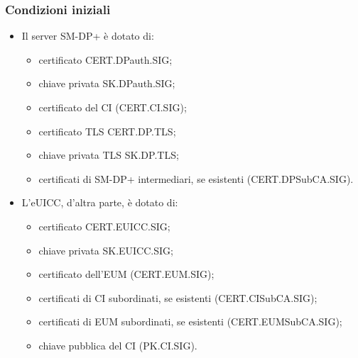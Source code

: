 \documentclass[10pt, oneside]{book}
\begin{document}
\subsubsection{Condizioni iniziali}
\begin{itemize}
\item Il server SM-DP+ è dotato di:
\begin{itemize}[itemsep=0pt]
\item certificato CERT.DPauth.SIG;
\item chiave privata SK.DPauth.SIG;
\item certificato del CI (CERT.CI.SIG);
\item certificato TLS CERT.DP.TLS;
\item chiave privata TLS SK.DP.TLS;
\item certificati di SM-DP+ intermediari, se esistenti (CERT.DPSubCA.SIG).
\end{itemize}
\item L'eUICC, d'altra parte, è dotato di:
\begin{itemize}[itemsep=0pt]
\item certificato CERT.EUICC.SIG;
\item chiave privata SK.EUICC.SIG;
\item certificato dell'EUM (CERT.EUM.SIG);
\item certificati di CI subordinati, se esistenti (CERT.CISubCA.SIG);
\item certificati di EUM subordinati, se esistenti (CERT.EUMSubCA.SIG);
\item chiave pubblica del CI (PK.CI.SIG).
\end{itemize}
\end{itemize}
\end{document}

